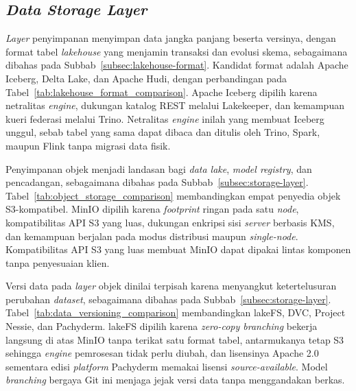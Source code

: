 

\subsection{\textit{Data Storage Layer}}
\label{subsec:pilih-penyimpanan}

\textit{Layer} penyimpanan menyimpan data jangka panjang beserta versinya, dengan format tabel \textit{lakehouse} yang menjamin transaksi dan evolusi skema, sebagaimana dibahas pada Subbab~\ref{subsec:lakehouse-format}. Kandidat format adalah Apache Iceberg, Delta Lake, dan Apache Hudi, dengan perbandingan pada Tabel~\ref{tab:lakehouse_format_comparison}. Apache Iceberg dipilih karena netralitas \textit{engine}, dukungan katalog REST melalui Lakekeeper, dan kemampuan kueri federasi melalui Trino. Netralitas \textit{engine} inilah yang membuat Iceberg unggul, sebab tabel yang sama dapat dibaca dan ditulis oleh Trino, Spark, maupun Flink tanpa migrasi data fisik.



Penyimpanan objek menjadi landasan bagi \textit{data lake}, \textit{model registry}, dan pencadangan, sebagaimana dibahas pada Subbab~\ref{subsec:storage-layer}. Tabel~\ref{tab:object_storage_comparison} membandingkan empat penyedia objek S3-kompatibel. MinIO dipilih karena \textit{footprint} ringan pada satu \textit{node}, kompatibilitas API S3 yang luas, dukungan enkripsi sisi \textit{server} berbasis KMS, dan kemampuan berjalan pada modus distribusi maupun \textit{single-node}. Kompatibilitas API S3 yang luas membuat MinIO dapat dipakai lintas komponen tanpa penyesuaian klien.



Versi data pada \textit{layer} objek dinilai terpisah karena menyangkut ketertelusuran perubahan \textit{dataset}, sebagaimana dibahas pada Subbab~\ref{subsec:storage-layer}. Tabel~\ref{tab:data_versioning_comparison} membandingkan lakeFS, DVC, Project Nessie, dan Pachyderm. lakeFS dipilih karena \textit{zero-copy branching} bekerja langsung di atas MinIO tanpa terikat satu format tabel, antarmukanya tetap S3 sehingga \textit{engine} pemrosesan tidak perlu diubah, dan lisensinya Apache 2.0 sementara edisi \textit{platform} Pachyderm memakai lisensi \textit{source-available}. Model \textit{branching} bergaya Git ini menjaga jejak versi data tanpa menggandakan berkas.



